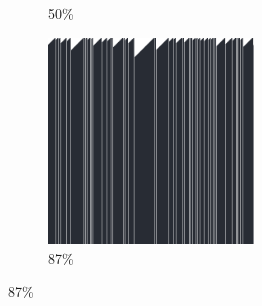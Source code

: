 \documentclass[12pt, fleqn]{report}                             %
\theoremstyle{break}                                            %
\begin{document}
\begin{figure}[ht!]
\begin{subfigure}[b]{0.4\linewidth}
          \caption{50\%}
        \end{subfigure}
        \begin{subfigure}[b]{0.4\linewidth}
          \includegraphics[width=0.6\textwidth]{Images/140/d.png}
          \caption{87\%}
        \end{subfigure}
      \end{figure}
\end{document}
